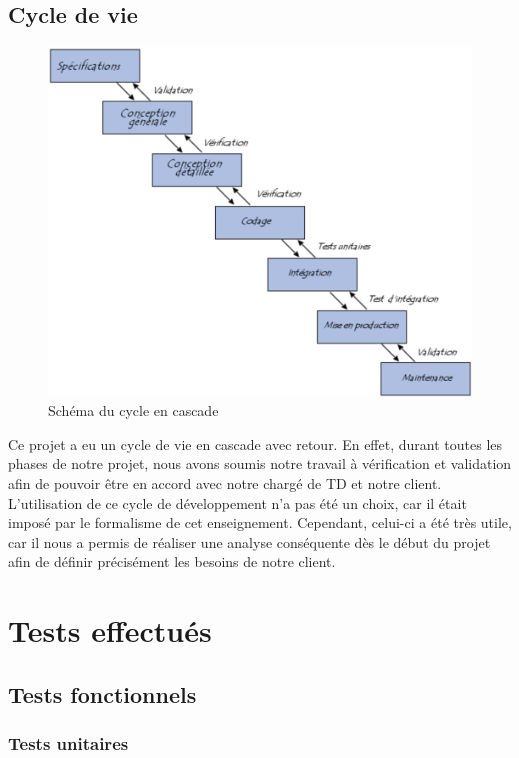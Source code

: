 \documentclass[17pts]{report}
\begin{document}
    \section{Cycle de vie}
    \label{sub:Cycle de vie}
\begin{figure}[H]
    \includegraphics[scale=0.7]{./illustrations/cycle_cascade.png}
    \centering
    \caption{Schéma du cycle en cascade}
    \label{fig:CycleCascade}
\end{figure}

Ce projet a eu un cycle de vie en cascade avec retour. En effet, durant toutes
les phases de notre projet, nous avons soumis notre travail à vérification et
validation afin de pouvoir être en accord avec notre chargé de TD et notre
client. L'utilisation de ce cycle de développement n'a pas été un choix, car il
était imposé par le formalisme de cet enseignement. Cependant, celui-ci a été
très utile, car il nous a permis de réaliser une analyse conséquente dès le
début du projet afin de définir précisément les besoins de notre client.

\chapter{Tests effectués}
\label{cha:Tests}
\section{Tests fonctionnels}
\label{sec:Tests fonctionnels}
\subsection{Tests unitaires}
\label{sub:Tests unitaires}
\end{document}
